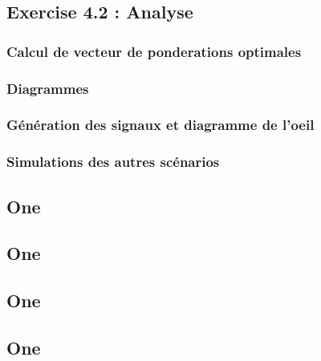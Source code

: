 \documentclass[11pt]{beamer}
\begin{document}
	\subsection{Exercise 4.2 : Analyse }
	\begin{frame}
		
	
		\frametitle{Calcul de vecteur de ponderations optimales}
	\end{frame}
	\begin{frame}

		\frametitle{Diagrammes}
	\end{frame}
\begin{frame}
	
	\frametitle{Génération des signaux et diagramme de l'oeil}
\end{frame}
\begin{frame}

	\frametitle{Simulations des autres scénarios}
\end{frame}
\begin{frame}
	\subsection{One}
	\frametitle{}
\end{frame}

\begin{frame}
	\subsection{One}
	\frametitle{}
\end{frame}

\begin{frame}
	\subsection{One}
	\frametitle{}
\end{frame}



\begin{frame}
	\subsection{One}
	\frametitle{}
\end{frame}
\end{document}
